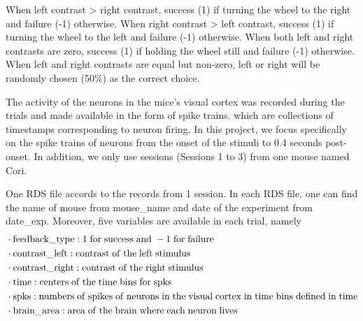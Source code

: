 \documentclass[12pt]{article}
\begin{document}
When left contrast > right contrast, success (1) if turning the wheel to the right and failure (-1) otherwise.
When right contrast > left contrast, success (1) if turning the wheel to the left and failure (-1) otherwise.
When both left and right contrasts are zero, success (1) if holding the wheel still and failure (-1) otherwise.
When left and right contrasts are equal but non-zero, left or right will be randomly chosen (50$\%$) as the correct choice.

The activity of the neurons in the mice’s visual cortex was recorded during the trials and made available in the form of spike trains. which are collections of timestamps corresponding to neuron firing. In this project, we focus specifically on the spike trains of neurons from the onset of the stimuli to 0.4 seconds post-onset. In addition, we only use sessions (Sessions 1 to 3) from one mouse named Cori.

One RDS file accords to the records from 1 session. In each RDS file, one can find the name of mouse from mouse\_name and date of the experiment from date\_exp. Moreover, five variables are available in each trial, namely 
\begin{align}
&\cdot\rm feedback\_type: 1\; for\;success\;and \; -1\;for\;failure
\nonumber\\  &\cdot\rm contrast\_left: contrast\; of \;the\; left\; stimulus \nonumber\\&\cdot \rm contrast\_right:contrast\; of \;the\; right\; stimulus 
\nonumber\\&\cdot \rm time: centers\; of\; the\; time\; bins\; for\; spks
\nonumber\\&\cdot \rm spks: numbers\; of \;spikes\; of\; neurons \;in\; the\; visual\; cortex\; in\; time\; bins\; defined\; in\; time
\nonumber\\&\cdot \rm brain\_area: area\; of\; the\; brain\; where\; each\; neuron\; lives\nonumber
\end{align}
\end{document}
